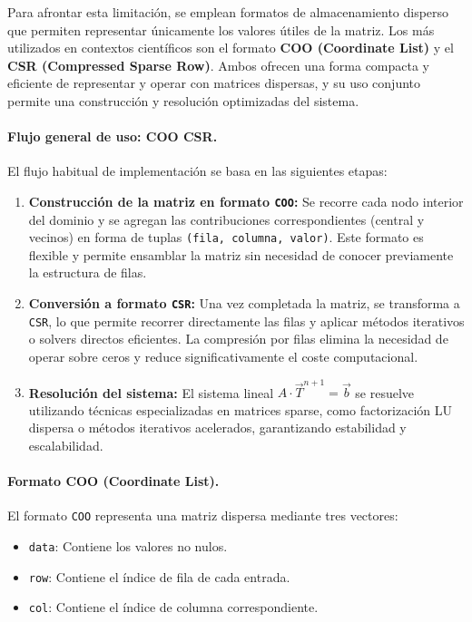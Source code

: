 \documentclass{article}
\begin{document}
Para afrontar esta limitación, se emplean formatos de almacenamiento disperso que permiten representar únicamente los valores útiles de la matriz. Los más utilizados en contextos científicos son el formato \textbf{COO (Coordinate List)} y el \textbf{CSR (Compressed Sparse Row)}. Ambos ofrecen una forma compacta y eficiente de representar y operar con matrices dispersas, y su uso conjunto permite una construcción y resolución optimizadas del sistema.

\paragraph{Flujo general de uso: COO \textrightarrow{} CSR.}

El flujo habitual de implementación se basa en las siguientes etapas:

\begin{enumerate}
    \item \textbf{Construcción de la matriz en formato \texttt{COO}:} Se recorre cada nodo interior del dominio y se agregan las contribuciones correspondientes (central y vecinos) en forma de tuplas \texttt{(fila, columna, valor)}. Este formato es flexible y permite ensamblar la matriz sin necesidad de conocer previamente la estructura de filas.

    \item \textbf{Conversión a formato \texttt{CSR}:} Una vez completada la matriz, se transforma a \texttt{CSR}, lo que permite recorrer directamente las filas y aplicar métodos iterativos o solvers directos eficientes. La compresión por filas elimina la necesidad de operar sobre ceros y reduce significativamente el coste computacional.

    \item \textbf{Resolución del sistema:} El sistema lineal $A \cdot \vec{T}^{n+1} = \vec{b}$ se resuelve utilizando técnicas especializadas en matrices sparse, como factorización LU dispersa o métodos iterativos acelerados, garantizando estabilidad y escalabilidad.
\end{enumerate}

\paragraph{Formato COO (Coordinate List).} 
\label{par:coo} El formato \texttt{COO} representa una matriz dispersa mediante tres vectores:
\begin{itemize}
    \item \texttt{data}: Contiene los valores no nulos.
    \item \texttt{row}: Contiene el índice de fila de cada entrada.
    \item \texttt{col}: Contiene el índice de columna correspondiente.
\end{itemize}
\end{document}
